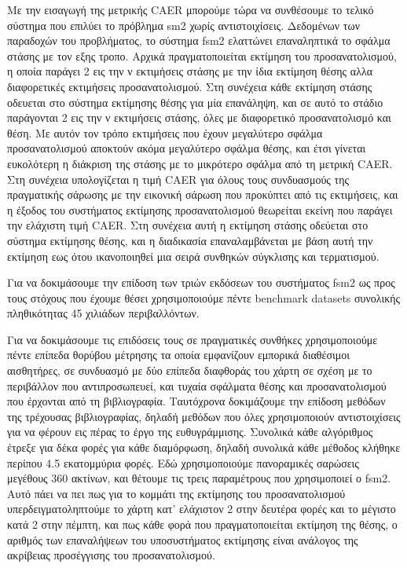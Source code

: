 \documentclass[a4paper,10pt]{article}
\begin{document}
Με την εισαγωγή της μετρικής CAER μπορούμε τώρα να συνθέσουμε το τελικό σύστημα
που επιλύει το πρόβλημα sm2 χωρίς αντιστοιχίσεις. Δεδομένων των παραδοχών του
προβλήματος, το σύστημα fsm2 ελαττώνει επαναληπτικά το σφάλμα στάσης με τον
εξης τροπο.  Αρχικά πραγματοποιείται εκτίμηση του προσανατολισμού, η οποία
παράγει 2 εις την ν εκτιμήσεις στάσης με την ίδια εκτίμηση θέσης αλλα
διαφορετικές εκτιμήσεις προσανατολισμού.  Στη συνέχεια κάθε εκτίμηση στάσης
οδευεται στο σύστημα εκτίμησης θέσης για μία επανάληψη, και σε αυτό το στάδιο
παράγονται 2 εις την ν εκτιμήσεις στάσης, όλες με διαφορετικό προσανατολισμό
και θέση. Με αυτόν τον τρόπο εκτιμήσεις που έχουν μεγαλύτερο σφάλμα
προσανατολισμού αποκτούν ακόμα μεγαλύτερο σφάλμα θέσης, και έτσι γίνεται
ευκολότερη η διάκριση της στάσης με το μικρότερο σφάλμα από τη μετρική CAER.
Στη συνέχεια υπολογίζεται η τιμή CAER για όλους τους συνδυασμούς της
πραγματικής σάρωσης με την εικονική σάρωση που προκύπτει από τις εκτιμήσεις,
και η έξοδος του συστήματος εκτίμησης προσανατολισμού θεωρείται εκείνη που
παράγει την ελάχιστη τιμή CAER. Στη συνέχεια αυτή η εκτίμηση στάσης οδεύεται
στο σύστημα εκτίμησης θέσης, και η διαδικασία επαναλαμβάνεται με βάση αυτή την
εκτίμηση εως ότου ικανοποιηθεί μια σειρά συνθηκών σύγκλισης και τερματισμού.


Για να δοκιμάσουμε την επίδοση των τριών εκδόσεων του συστήματος fsm2 ως προς
τους στόχους που έχουμε θέσει χρησιμοποιούμε πέντε benchmark datasets συνολικής
πληθικότητας 45 χιλιάδων περιβαλλόντων.

Για να δοκιμάσουμε τις επιδόσεις τους σε πραγματικές συνθήκες χρησιμοποιούμε
πέντε επίπεδα θορύβου μέτρησης τα οποία εμφανίζουν εμπορικά διαθέσιμοι
αισθητήρες, σε συνδυασμό με δύο επίπεδα διαφθοράς του χάρτη σε σχέση με το
περιβάλλον που αντιπροσωπευεί, και τυχαία σφάλματα θέσης και προσανατολισμού
που έρχονται από τη βιβλιογραφία. Ταυτόχρονα δοκιμάζουμε την επίδοση μεθόδων
της τρέχουσας βιβλιογραφίας, δηλαδή μεθόδων που όλες χρησιμοποιούν
αντιστοιχίσεις για να φέρουν εις πέρας το έργο της ευθυγράμμισης. Συνολικά κάθε
αλγόριθμος έτρεξε για δέκα φορές για κάθε διαμόρφωση, δηλαδή συνολικά κάθε
μέθοδος κλήθηκε περίπου 4.5 εκατομμύρια φορές.  Εδώ χρησιμοποιούμε πανοραμικές
σαρώσεις μεγέθους 360 ακτίνων, και θέτουμε τις τρεις παραμέτρους που
χρησιμοποιεί ο fsm2. Αυτό πάει να πει πως για το κομμάτι της εκτίμησης του
προσανατολισμού υπερδειγματοληπτούμε το χάρτη κατ' ελάχιστον 2 στην δευτέρα
φορές και το μέγιστο κατά 2 στην πέμπτη, και πως κάθε φορά που πραγματοποιείται
εκτίμηση της θέσης, ο αριθμός των επαναλήψεων του υποσυστήματος εκτίμησης είναι
ανάλογος της ακρίβειας προσέγγισης του προσανατολισμού.
\end{document}
